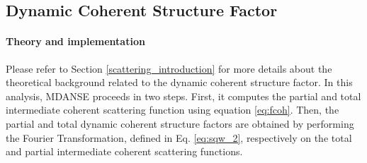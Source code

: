 \documentclass[a4paper,11pt]{article}
\begin{document}
\subsection{Dynamic Coherent Structure Factor}
\label{dcsf}
\paragraph{Theory and implementation\\}
\label{dcsf_theory}
Please refer to Section \ref{scattering_introduction} for more details about the theoretical background related to the dynamic 
coherent structure factor. In this analysis, \gls{MDANSE} proceeds in two steps. First, it computes the partial and total 
intermediate coherent scattering function using equation \ref{eq:fcoh}. Then, the partial and total dynamic coherent 
structure factors are obtained by performing the Fourier Transformation, defined in Eq. \ref{eq:sqw_2}, respectively on 
the total and partial intermediate coherent scattering functions.
\end{document}
